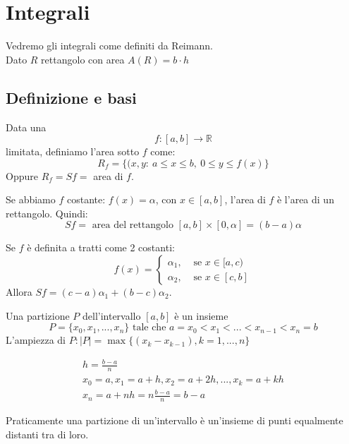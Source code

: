 



\chapter{Integrali}\label{chap:integrali} %
Vedremo gli integrali come definiti da Reimann. \\
Dato $R$ rettangolo con area $A(R)=b\cdot h$ \\

\section{Definizione e basi}\label{sec:definizione_e_basi}


Data una
\begin{equation}
f:[a,b]\to \mathbb{R}
\end{equation}
limitata, definiamo l'area sotto $f$ come:
\begin{equation}
    R_f=\{(x,y:\ a\leq x\leq b,\ 0\leq y\leq f(x)\}
    \label{eq:rf}
\end{equation}
Oppure $R_f=Sf=$ area di $f$. \\

\begin{osservazione}[]
    Se abbiamo $f$ costante: $f(x)=\alpha$, con $x\in[a,b]$, l'area di $f$ è l'area di un rettangolo. Quindi:
    \begin{equation}
        Sf= \text{ area del rettangolo } [a,b]\times[0,\alpha]=(b-a)\alpha
        \label{eq:area_costante}
    \end{equation}

    Se $f$ è definita a tratti come 2 costanti:
    \[
        f(x)=\begin{cases}
            \alpha_1, &\text{ se }x\in[a,c)\\
            \alpha_2, &\text{ se }x\in[c,b]
        \end{cases}
    \]
    Allora $Sf=(c-a)\alpha_1+(b-c)\alpha_2$.
\end{osservazione}
\begin{definizione}[]
    Una partizione $P$ dell'intervallo $[a,b]$ è un insieme
    \begin{equation}
        P = \{x_0,x_1,...,x_n\} \text{ tale che } a=x_0<x_1<...<x _{n-1}< x_n=b
        \label{eq:part}
    \end{equation}
    L'ampiezza di $P : |P|=\max\{(x_k-x _{k-1}), k=1,...,n\}$
\end{definizione}
\begin{esempio}[]
    \begin{gather}
        h = \frac{b-a}{n} \\
        x_0 = a, x_1 = a+h, x_2=a+2h, ..., x_k=a+kh \\
        x_n=a+nh=n\frac{b-a}{n}=b-a
        \label{eq:espart}
    \end{gather}
\end{esempio}
Praticamente una partizione di un'intervallo è un'insieme di punti equalmente distanti tra di loro. \\

